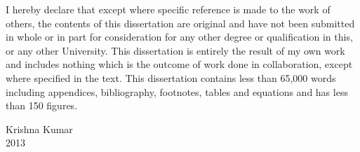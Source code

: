 
\begin{declaration} %

I hereby declare that except where specific reference is made to the work of others, the contents of this dissertation are original and have not been submitted in whole or in part for consideration for any other degree or qualification in this, or any other University. This dissertation is entirely the result of my own work and includes nothing which is the outcome of work done in collaboration, except where specified in the text. This dissertation contains less than 65,000 words including appendices, bibliography, footnotes, tables and equations and has less than 150 figures.

\flushright

Krishna Kumar\\
2013
\end{declaration}

